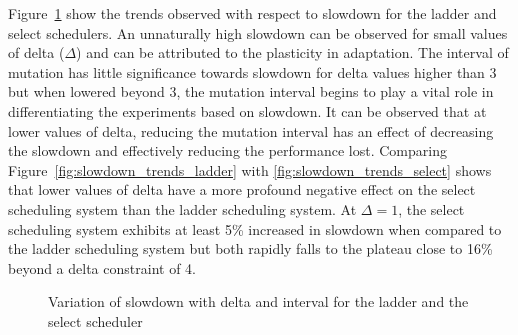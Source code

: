 Figure~\ref{fig:slowdown_trends} show the trends
observed with respect to slowdown for the ladder and select schedulers. An unnaturally 
high slowdown can be observed for small values of delta ($\Delta$) and can be attributed
to the plasticity in adaptation. The interval of mutation has little significance towards slowdown
for delta values higher than 3 but when lowered beyond 3, the mutation interval begins to play a vital 
role in differentiating the experiments based on slowdown. It can be observed that at lower values
of delta, reducing the mutation interval has an effect of decreasing the slowdown and effectively 
reducing the performance lost. Comparing Figure~\ref{fig:slowdown_trends_ladder} 
with \ref{fig:slowdown_trends_select} shows that lower values of delta have a more profound negative 
effect on the select scheduling system than the ladder scheduling system. At $\Delta = 1$, the select scheduling
system exhibits at least 5\% increased in slowdown when compared to the ladder scheduling system but 
both rapidly falls to the plateau close to 16\% beyond a delta constraint of 4. 

\begin{figure}[h!]
\centering
  \label{fig:slowdown_trends}
  \caption{Variation of slowdown with delta and interval for the ladder  and the select  scheduler}
\end{figure}

